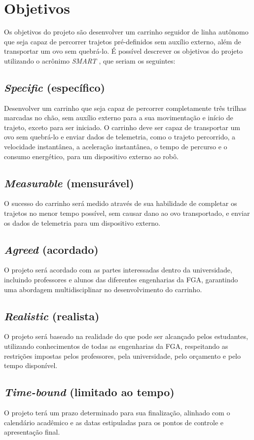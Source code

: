 \section{Objetivos}

Os objetivos do projeto são desenvolver um carrinho seguidor de linha autônomo
que seja capaz de percorrer trajetos pré-definidos sem auxílio externo, além de
transportar um ovo sem quebrá-lo. É possível descrever os objetivos do projeto
utilizando o acrônimo \textit{SMART}
\cite{University-of-California:SMART-Goals}, que seriam os seguintes:

\subsection{\textit{Specific} (específico)}

Desenvolver um carrinho que seja capaz de percorrer completamente três
trilhas marcadas no chão, sem auxílio externo para a sua movimentação e
início de trajeto, exceto para ser iniciado. O carrinho deve ser capaz de
transportar um ovo sem quebrá-lo e enviar dados de telemetria, como o trajeto
percorrido, a velocidade instantânea, a aceleração instantânea, o tempo de
percurso e o consumo energético, para um dispositivo externo ao robô.
 
\subsection{\textit{Measurable} (mensurável)}

O sucesso do carrinho será medido através de sua habilidade de completar os
trajetos no menor tempo possível, sem causar dano ao ovo transportado, e
enviar os dados de telemetria para um dispositivo externo.

\subsection{\textit{Agreed} (acordado)}

O projeto será acordado com as partes interessadas dentro da universidade,
incluindo professores e alunos das diferentes engenharias da FGA, garantindo
uma abordagem multidisciplinar no desenvolvimento do carrinho.

\subsection{\textit{Realistic} (realista)}

O projeto será baseado na realidade do que pode ser alcançado pelos estudantes,
utilizando conhecimentos de todas as engenharias da FGA, respeitando as
restrições impostas pelos professores, pela universidade, pelo orçamento e
pelo tempo disponível.

\subsection{\textit{Time-bound} (limitado ao tempo)}

O projeto terá um prazo determinado para sua finalização, alinhado com o
calendário acadêmico e as datas estipuladas para os pontos de controle e
apresentação final.
